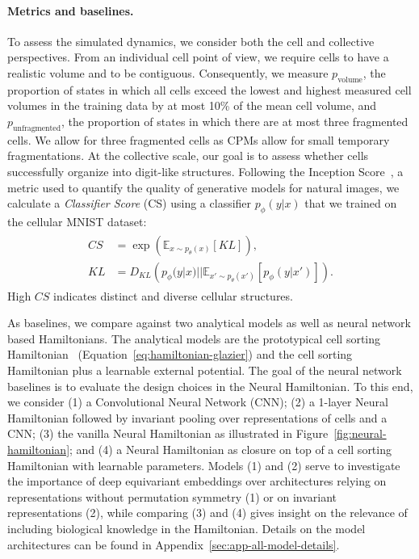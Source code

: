 \paragraph{Metrics and baselines.}
To assess the simulated dynamics, we consider both the cell and collective perspectives. From an individual cell point of view, we require cells to have a realistic volume and to be contiguous. Consequently, we measure $p_\text{volume}$, the proportion of states in which all cells exceed the lowest and highest measured cell volumes in the training data by at most 10\% of the mean cell volume, and $p_\text{unfragmented}$, the proportion of states in which there are at most three fragmented cells. We allow for three fragmented cells as CPMs allow for small temporary fragmentations. At the collective scale, our goal is to assess whether cells successfully organize into digit-like structures. Following the Inception Score~\cite{Salimans2016IS}, a metric used to quantify the quality of generative models for natural images, we calculate a \textit{Classifier Score} (CS) using a classifier $p_\phi(y | x)$ that we trained on the cellular MNIST dataset:
\begin{gather}
\begin{aligned}
    CS &= \exp\left(\mathbb{E}_{x \sim p_\theta(x)}\left[KL\right]\right),\\
    KL &= D_{KL}\left( p_\phi(y | x) || \mathbb{E}_{x' \sim p_\theta(x')} \left[p_\phi(y | x')\right]  \right).
\end{aligned}
\end{gather}
High $CS$ indicates distinct and diverse cellular structures.

As baselines, we compare against two analytical models as well as neural network based Hamiltonians. The analytical models are the prototypical cell sorting Hamiltonian~\cite{Graner1992} (Equation~\ref{eq:hamiltonian-glazier}) and the cell sorting Hamiltonian plus a learnable external potential. The goal of the neural network baselines is to evaluate the design choices in the Neural Hamiltonian. To this end, we consider (1) a Convolutional Neural Network (CNN); (2) a 1-layer Neural Hamiltonian followed by invariant pooling over representations of cells and a CNN; (3) the vanilla Neural Hamiltonian as illustrated in Figure~\ref{fig:neural-hamiltonian}; and (4) a Neural Hamiltonian as closure on top of a cell sorting Hamiltonian with learnable parameters. Models (1) and (2) serve to investigate the importance of deep equivariant embeddings over architectures relying on representations without permutation symmetry (1) or on invariant representations (2), while comparing (3) and (4) gives insight on the relevance of including biological knowledge in the Hamiltonian. Details on the model architectures can be found in Appendix~\ref{sec:app-all-model-details}.

